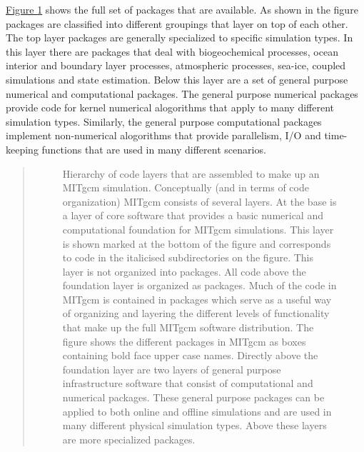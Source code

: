 \documentclass[letterpaper,10pt,english]{sphinxmanual}
\begin{document}
\hyperref[\detokenize{phys_pkgs/phys_pkgs:package-organigramme}]{Figure \ref{\detokenize{phys_pkgs/phys_pkgs:package-organigramme}}} shows the full set of packages that
are available. As shown in the figure packages are classified into different
groupings that layer on top of each other. The top layer packages are
generally specialized to specific simulation types. In this layer there are
packages that deal with biogeochemical processes, ocean interior
and boundary layer processes, atmospheric processes, sea-ice, coupled
simulations and state estimation.
Below this layer are a set of general purpose
numerical and computational packages. The general purpose numerical packages
provide code for kernel numerical alogorithms
that apply to
many different simulation types. Similarly, the general purpose computational
packages implement non-numerical alogorithms that provide parallelism,
I/O and time-keeping functions that are used in many different scenarios.
\begin{quote}
\begin{figure}[htbp]
\centering
\capstart

\noindent{}
\caption{Hierarchy of code layers that are assembled to make up an MITgcm simulation. Conceptually (and in terms of code organization) MITgcm consists of several layers. At the base is a layer of core software that provides a basic numerical and computational foundation for MITgcm simulations. This layer is shown marked  at the bottom of the figure and corresponds to code in the italicised subdirectories on the figure. This layer is not organized into packages. All code above the foundation layer is organized as packages.  Much of the code in MITgcm is contained in packages which serve as a useful way of organizing and layering the different levels of functionality that make up the full MITgcm software distribution. The figure shows the different packages in MITgcm as boxes containing bold face upper case names.  Directly above the foundation layer are two layers of general purpose infrastructure software that consist of computational and numerical packages.  These general purpose packages can be applied to both online and offline simulations and are used in many different physical simulation types.  Above these layers are more specialized packages.}\label{\detokenize{phys_pkgs/phys_pkgs:package-organigramme}}\end{figure}
\end{quote}
\end{document}
